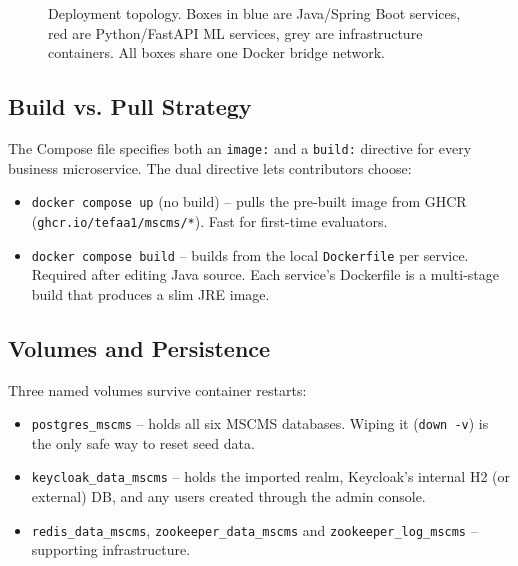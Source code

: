 \documentclass[12pt,a4paper,oneside]{report}
\begin{document}
\begin{figure}[ht]
\caption{Deployment topology. Boxes in blue are Java/Spring Boot services,
         red are Python/FastAPI ML services, grey are infrastructure
         containers. All boxes share one Docker bridge network.}
\label{fig:deploy}
\end{figure}

\subsection{Build vs. Pull Strategy}
The Compose file specifies both an \texttt{image:} and a \texttt{build:}
directive for every business microservice. The dual directive lets
contributors choose:

\begin{itemize}[leftmargin=*]
  \item \texttt{docker compose up} (no build) -- pulls the pre-built image
        from GHCR (\texttt{ghcr.io/tefaa1/mscms/*}). Fast for first-time
        evaluators.
  \item \texttt{docker compose build} -- builds from the local
        \texttt{Dockerfile} per service. Required after editing
        Java source. Each service's Dockerfile is a multi-stage build that
        produces a slim JRE image.
\end{itemize}

\subsection{Volumes and Persistence}
Three named volumes survive container restarts:
\begin{itemize}[leftmargin=*]
  \item \texttt{postgres\_mscms} -- holds all six MSCMS databases. Wiping
        it (\texttt{down -v}) is the only safe way to reset seed data.
  \item \texttt{keycloak\_data\_mscms} -- holds the imported realm,
        Keycloak's internal H2 (or external) DB, and any users created
        through the admin console.
  \item \texttt{redis\_data\_mscms}, \texttt{zookeeper\_data\_mscms}
        and \texttt{zookeeper\_log\_mscms} -- supporting infrastructure.
\end{itemize}
\end{document}
